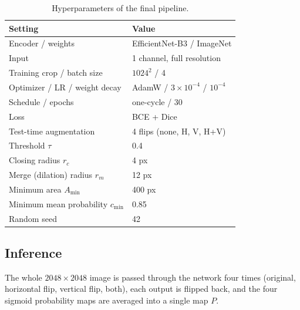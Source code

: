 \documentclass[sigconf]{acmart}
\begin{document}
\begin{table}[t]
  \caption{Hyperparameters of the final pipeline.}
  \label{tab:hyper}
  \small
  \begin{tabular}{ll}
    \toprule
    Setting & Value \\
    \midrule
    Encoder / weights & EfficientNet-B3 / ImageNet \\
    Input & 1 channel, full resolution \\
    Training crop / batch size & $1024^2$ / 4 \\
    Optimizer / LR / weight decay & AdamW / $3\times10^{-4}$ / $10^{-4}$ \\
    Schedule / epochs & one-cycle / 30 \\
    Loss & BCE + Dice \\
    Test-time augmentation & 4 flips (none, H, V, H+V) \\
    Threshold $\tau$ & 0.4 \\
    Closing radius $r_c$ & 4 px \\
    Merge (dilation) radius $r_m$ & 12 px \\
    Minimum area $A_{\min}$ & 400 px \\
    Minimum mean probability $c_{\min}$ & 0.85 \\
    Random seed & 42 \\
    \bottomrule
  \end{tabular}
\end{table}

\subsection{Inference}
    The whole $2048\times2048$ image is passed through the network four times (original, horizontal flip, vertical flip, both), each output is flipped back, and the four sigmoid probability maps are averaged into a single map $P$.
\end{document}
